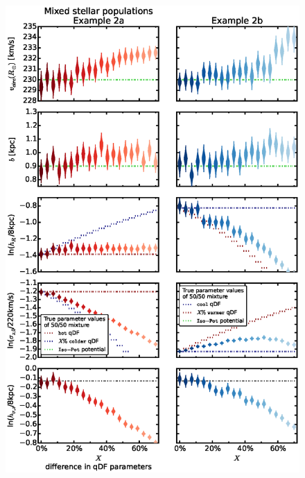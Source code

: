 \begin{figure}[!htbp]
\centering
\includegraphics[scale=0.45]{figs/isoSphFlexMixDiff_violins_2.eps}

\end{figure}
